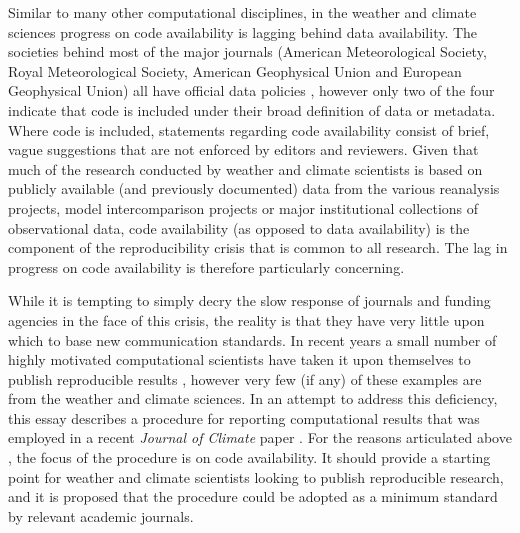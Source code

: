Similar to many other computational disciplines, in the weather and climate sciences progress on code availability is lagging behind data availability. The societies behind most of the major journals (American Meteorological Society, Royal Meteorological Society, American Geophysical Union and European Geophysical Union) all have official data policies \citep[e.g.][]{Mayernik2015}, however only two of the four indicate that code is included under their broad definition of data or metadata. Where code is included, statements regarding code availability consist of brief, vague suggestions that are not enforced by editors and reviewers. Given that much of the research conducted by weather and climate scientists is based on publicly available (and previously documented) data from the various reanalysis projects, model intercomparison projects or major institutional collections of observational data, code availability (as opposed to data availability) is the component of the reproducibility crisis that is common to all research. The lag in progress on code availability is therefore particularly concerning. 

While it is tempting to simply decry the slow response of journals and funding agencies in the face of this crisis, the reality is that they have very little upon which to base new communication standards. In recent years a small number of highly motivated computational scientists have taken it upon themselves to publish reproducible results \citep[e.g.][]{Ketcheson2012,Crooks2014,Schmitt2015}, however very few (if any) of these examples are from the weather and climate sciences. In an attempt to address this deficiency, this essay describes a procedure for reporting computational results that was employed in a recent \textit{Journal of Climate} paper \citep[][hereafter referred to as IS2015]{Irving2016}. For the reasons articulated above \citep[and the fact that data availability was already addressed in a recent BAMS essay;][]{Mayernik2015a}, the focus of the procedure is on code availability. It should provide a starting point for weather and climate scientists looking to publish reproducible research, and it is proposed that the procedure could be adopted as a minimum standard by relevant academic journals.
  
  
  
  
  
  
  
  